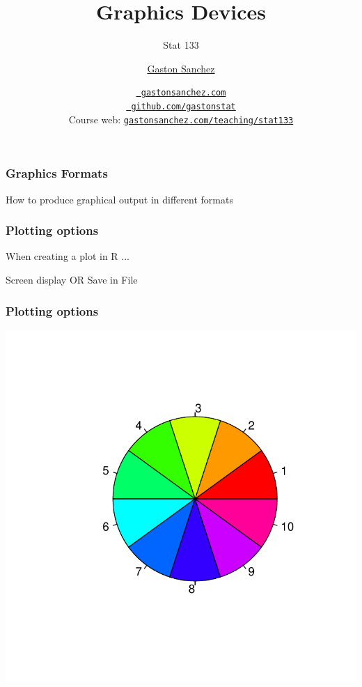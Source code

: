 \documentclass[12pt]{beamer}\usepackage[]{graphicx}\usepackage[]{color}
\title{Graphics Devices}
\subtitle{Stat 133}
\author{\href{http://www.gastonsanchez.com}{Gaston Sanchez}}
\institute{Department of Statistics, UC{\textendash}Berkeley}
\date{\href{http://www.gastonsanchez.com}{\tt \scriptsize \color{foreground} gastonsanchez.com}
\\[-4pt]
\href{http://github.com/gastonstat}{\tt \scriptsize \color{foreground} github.com/gastonstat}
\\[-4pt]
{\scriptsize Course web: \href{http://www.gastonsanchez.com/teaching/stat133}{\tt gastonsanchez.com/teaching/stat133}}
}
\newenvironment{knitrout}{}{} %
\begin{document}
{
  \frame{
    \titlepage
  } 
}


\begin{frame}
\frametitle{Graphics Formats}

{\Large How to produce graphical output in different formats}

\end{frame}


\begin{frame}
\frametitle{Plotting options}

\centerline{\Large \mdlit When creating a plot in R ...}

\vspace{18pt}

\centerline{\Large Screen display \quad OR \quad Save in File}

\end{frame}


\begin{frame}[fragile]
\frametitle{Plotting options}

\begin{knitrout}\footnotesize
{}\color{fgcolor}

{\centering \includegraphics[width=.8\linewidth,height=.8\linewidth]{figure/unnamed-chunk-1-1} 

}



\end{knitrout}

\end{frame}
\end{document}
